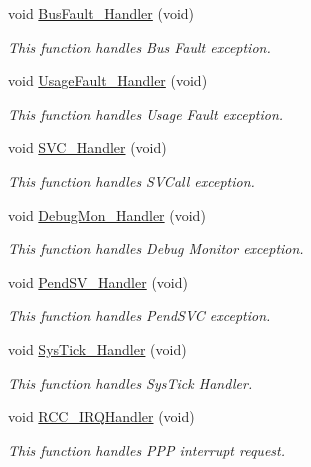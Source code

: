 \begin{DoxyCompactItemize}
void \hyperlink{group___r_c_c___example_ga850cefb17a977292ae5eb4cafa9976c3}{Bus\-Fault\-\_\-\-Handler} (void)
\begin{DoxyCompactList}\small\item\em This function handles Bus Fault exception. \end{DoxyCompactList}\item 
void \hyperlink{group___r_c_c___example_ga1d98923de2ed6b7309b66f9ba2971647}{Usage\-Fault\-\_\-\-Handler} (void)
\begin{DoxyCompactList}\small\item\em This function handles Usage Fault exception. \end{DoxyCompactList}\item 
void \hyperlink{group___r_c_c___example_ga3e5ddb3df0d62f2dc357e64a3f04a6ce}{S\-V\-C\-\_\-\-Handler} (void)
\begin{DoxyCompactList}\small\item\em This function handles S\-V\-Call exception. \end{DoxyCompactList}\item 
void \hyperlink{group___r_c_c___example_gadbdfb05858cc36fc520974df37ec3cb0}{Debug\-Mon\-\_\-\-Handler} (void)
\begin{DoxyCompactList}\small\item\em This function handles Debug Monitor exception. \end{DoxyCompactList}\item 
void \hyperlink{group___r_c_c___example_ga6303e1f258cbdc1f970ce579cc015623}{Pend\-S\-V\-\_\-\-Handler} (void)
\begin{DoxyCompactList}\small\item\em This function handles Pend\-S\-V\-C exception. \end{DoxyCompactList}\item 
void \hyperlink{group___r_c_c___example_gab5e09814056d617c521549e542639b7e}{Sys\-Tick\-\_\-\-Handler} (void)
\begin{DoxyCompactList}\small\item\em This function handles Sys\-Tick Handler. \end{DoxyCompactList}\item 
void \hyperlink{group___r_c_c___example_ga485ab398adc303a0ca68885dddcbfe07}{R\-C\-C\-\_\-\-I\-R\-Q\-Handler} (void)
\begin{DoxyCompactList}\small\item\em This function handles P\-P\-P interrupt request. \end{DoxyCompactList}\end{DoxyCompactItemize}


